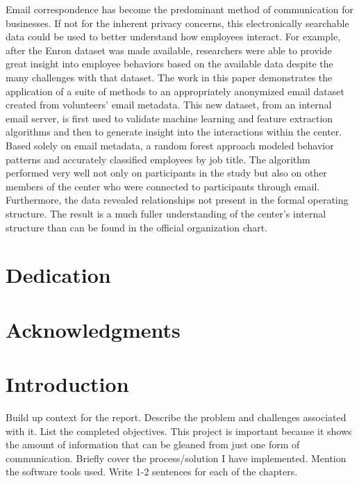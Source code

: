 \documentclass[12pt,dvips]{report}
\begin{document}
Email correspondence has become the predominant method of communication for businesses.  
If not for the inherent privacy concerns, this electronically searchable data could be used to better understand how employees interact. 
For example, after the Enron dataset was made available, researchers were able to provide great insight into employee behaviors based on the available data despite the many challenges with that dataset.  
The work in this paper demonstrates the application of a suite of methods to an appropriately anonymized email dataset created from volunteers' email metadata.  
This new dataset, from an internal email server, is first used to validate machine learning and feature extraction algorithms and then to generate insight into the interactions within the center.  
Based solely on email metadata, a random forest approach modeled behavior patterns and accurately classified employees by job title.  
The algorithm performed very well not only on participants in the study but also on other members of the center who were connected to participants through email. 
Furthermore, the data revealed relationships not present in the formal operating structure. 
The result is a much fuller understanding of the center's internal structure than can be found in the official organization chart.


\vfill



\pagebreak

\chapter*{Dedication}
\chapter*{Acknowledgments}

\tableofcontents
\pagebreak

\listoffigures
\pagebreak

\listoftables
\pagebreak

\pagestyle{myheadings}

\chapter{Introduction}
Build up context for the report.  Describe the problem and challenges associated with it.  List the completed objectives.  This project is important because it shows the amount of information that can be gleaned from just one form of communication.  Briefly cover the process/solution I have implemented.  Mention the software tools used.  Write 1-2 sentences for each of the chapters. 
\end{document}
